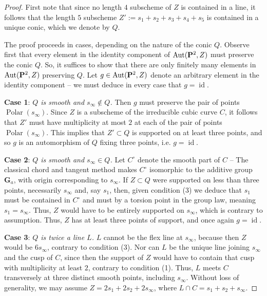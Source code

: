 \documentclass[12pt,reqno]{amsart}
\DeclareMathOperator{\id}{id}
\DeclareMathOperator{\Polar}{Polar}
\numberwithin{equation}{section}
\newcommand{\G}{\mathbf G}
\begin{document}
\begin{proof}
  First note that since no length $4$ subscheme of $Z$ is contained in
  a line, it follows that the length $5$ subscheme
  $Z' := s_1 + s_2 + s_3 +s_4 +s_5$ is contained in a unique conic,
  which we denote by $Q$.

  The proof proceeds in cases, depending on the nature of the conic
  $Q$.  Observe first that every element in the identity component of
  $\operatorname{Aut}({\bf P}^{2},Z)$ must preserve the conic $Q$. So, it suffices to
  show that there are only finitely many elements in $\operatorname{Aut}({\bf P}^{2},Z)$
  preserving $Q$.  Let $g \in \operatorname{Aut}({\bf P}^{2},Z)$ denote an arbitrary
  element in the identity component -- we must deduce in every case
  that $g = \id$.

  {\bf Case 1}: {\sl $Q$ is smooth and $s_{\infty} \notin Q$.}    Then
  $g$ must preserve the pair of points $\Polar(s_{\infty})$. Since $Z$
  is a subscheme of the irreducible cubic curve $C$, it follows that
  $Z'$ must have multiplicity at most $2$ at each of the pair of
  points $\Polar(s_{\infty})$.  This implies that $Z' \subset Q$ is
  supported on at least three points, and so $g$ is an automorphism of
  $Q$ fixing three points, i.e. $g = \id$.


  {\bf Case 2}: {\sl $Q$ is smooth and $s_{\infty} \in Q$.}  Let
  $C^{\circ}$ denote the smooth part of $C$ -- The classical chord and
  tangent method makes $C^{\circ}$ isomorphic to the additive group
  $\G_{a}$, with origin corresponding to $s_{\infty}$. If
  $Z \subset Q$ were supported on less than three points, necessarily
  $s_{\infty}$ and, say $s_{1}$, then, given condition (3) we deduce
  that $s_{1}$ must be contained in $C^{\circ}$ and must by a torsion
  point in the group law, meaning $s_{1} = s_{\infty}$. Thus, $Z$
  would have to be entirely supported on $s_{\infty}$, which is
  contrary to assumption.  Thus, $Z$ has at least three points of
  support, and once again $g =\id$.

  {\bf Case 3}: {\sl $Q$ is twice a line $L$.} $L$ cannot be the flex
  line at $s_{\infty}$, because then $Z$ would be $6 s_{\infty}$,
  contrary to condition (3).  Nor can $L$ be the unique line joining
  $s_{\infty}$ and the cusp of $C$, since then the support of $Z$
  would have to contain that cusp with multiplicity at least $2$,
  contrary to condition (1). Thus, $L$ meets $C$ transversely at three
  distinct smooth points, including $s_{\infty}$.  Without loss of
  generality, we may assume $Z = 2s_1 + 2s_2 + 2s_{\infty}$, where
  $L \cap C = s_{1}+s_{2} + s_{\infty}$.


\end{proof}
\end{document}

